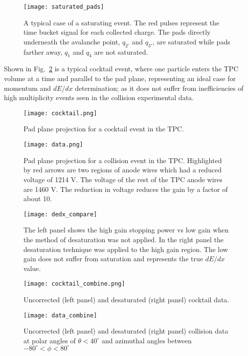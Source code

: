 \begin{figure}[ht!]
\texttt{[image: saturated\_pads]}
\caption{A typical case of a saturating event. The red pulses represent the time bucket signal for each collected charge. The pads directly underneath the avalanche point, $q_{2'}$ and $q_{3'}$, are saturated while pads farther away, $q_1$ and $q_4$ are not saturated.}
\label{fig:satpad}
\end{figure}

Shown in Fig.~\ref{fig:cocktail} is a typical cocktail event, where one particle enters the TPC volume at a time and parallel to the pad plane, representing an ideal case for momentum and $dE/dx$ determination; as it does not suffer from inefficiencies of high multiplicity events seen in the collision experimental data.  

\begin{figure}[ht!]
\texttt{[image: cocktail.png]}
\caption{Pad plane projection for a cocktail event in the TPC.}
\label{fig:cocktail}
\end{figure}

\begin{figure}[ht!]
\texttt{[image: data.png]}
\caption{Pad plane projection for a collision event in the TPC. Highlighted by red arrows are two regions of anode wires which had a reduced voltage of 1214 V. The voltage of the rest of the TPC anode wires are 1460 V. The reduction in voltage reduces the gain by a factor of about 10. }
\label{fig:data}
\end{figure}


\begin{figure*}[t]
\centering
\texttt{[image: dedx\_compare]}
\caption{The left panel shows the high gain stopping power vs low gain when the method of desaturation was not applied. In the right panel the desaturation technique was applied to the high gain region. The low gain does not suffer from saturation and represents the true $dE/dx$ value.}
\label{fig:lowvshigh}
\end{figure*}

\begin{figure*}[t]
\texttt{[image: cocktail\_combine.png]}
\caption{Uncorrected (left panel) and desaturated (right panel) cocktail data.}
\label{fig:cocktail_combine}
\end{figure*}

\begin{figure*}[t]
\texttt{[image: data\_combine]}
\caption{Uncorrected (left panel) and desaturated (right panel) collision data at polar angles of $\theta < 40^{\circ}$ and azimuthal angles between $-80^{\circ} < \phi < 80^{\circ}$}
\label{fig:data_combine}
\end{figure*}

